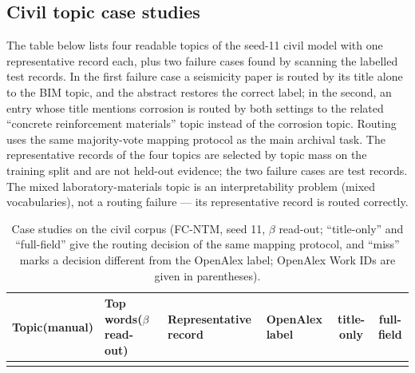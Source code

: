 \documentclass[11pt]{article}
\newcommand{\fcntm}{FC-NTM}
\begin{document}
\subsection{Civil topic case studies}

The table below lists four readable topics of the seed-11 civil model with one representative
record each, plus two failure cases found by scanning the labelled test records. In the first
failure case a seismicity paper is routed by its title alone to the BIM topic, and the abstract
restores the correct label; in the second, an entry whose title mentions corrosion is routed by
both settings to the related ``concrete reinforcement materials'' topic instead of the corrosion
topic. Routing uses the same majority-vote mapping protocol as the main archival task. The
representative records of the four topics are selected by topic mass on the training split and
are not held-out evidence; the two failure cases are test records. The mixed laboratory-materials
topic is an interpretability problem (mixed vocabularies), not a routing failure --- its
representative record is routed correctly.

\begin{table}[t]
\centering
\caption{Case studies on the civil corpus (\fcntm{}, seed 11, $\beta$ read-out; ``title-only'' and ``full-field'' give the routing decision of the same mapping protocol, and ``miss'' marks a decision different from the OpenAlex label; OpenAlex Work IDs are given in parentheses).}
\label{tab:civil-cases}
\scriptsize
\setlength{\tabcolsep}{3pt}
\begin{tabular}{@{}p{2.6cm}p{4.0cm}p{3.6cm}p{2.4cm}cc@{}}
\toprule
Topic(manual) & Top words($\beta$ read-out) & Representative record & OpenAlex label & title-only & full-field \\
\midrule

\\   %
\bottomrule
\end{tabular}
\end{table}
\end{document}
